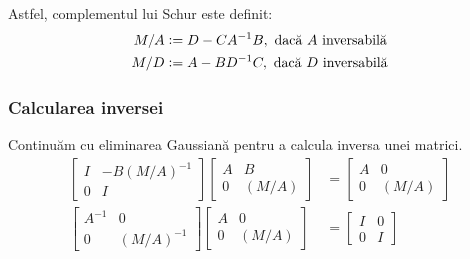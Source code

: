 \documentclass{exam}
\begin{document}
Astfel, complementul lui Schur este definit:
\begin{align*}
	M/A & \vcentcolon = D - C A^{-1} B, \text{ dacă } A \text{ inversabilă} \\
	M/D & \vcentcolon = A - B D^{-1} C, \text{ dacă } D \text{ inversabilă}
\end{align*}

\subsubsection{Calcularea inversei}
Continuăm cu eliminarea Gaussiană pentru a calcula inversa unei matrici.
\begin{align*}
	\begin{bmatrix}
		I & -B (M/A)^{-1} \\
		0 & I
	\end{bmatrix}
	\begin{bmatrix}
		A & B     \\
		0 & (M/A)
	\end{bmatrix}
	 & =
	\begin{bmatrix}
		A & 0     \\
		0 & (M/A)
	\end{bmatrix} \\
	\begin{bmatrix}
		A^{-1} & 0          \\
		0      & (M/A)^{-1}
	\end{bmatrix}
	\begin{bmatrix}
		A & 0     \\
		0 & (M/A)
	\end{bmatrix}
	 & =
	\begin{bmatrix}
		I & 0 \\
		0 & I
	\end{bmatrix}
\end{align*}
\end{document}

